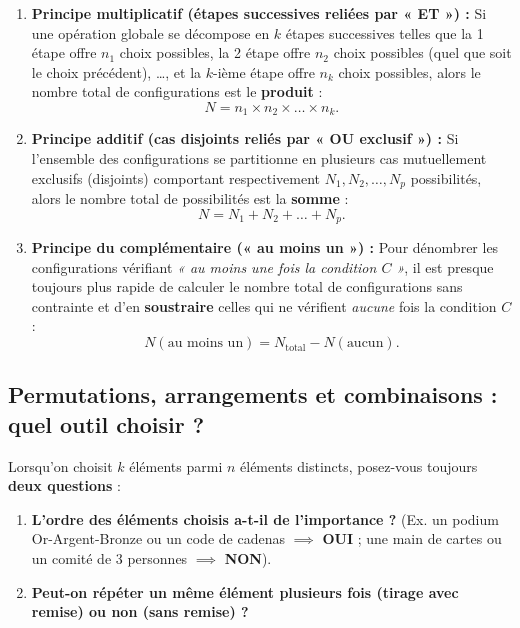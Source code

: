 \begin{theoreme}
\begin{enumerate}
    \item \textbf{Principe multiplicatif (étapes successives reliées par « ET ») :} Si une opération globale se décompose en $k$ étapes successives telles que la 1\iere{} étape offre $n_1$ choix possibles, la 2\ieme{} étape offre $n_2$ choix possibles (quel que soit le choix précédent), \dots, et la $k$-ième étape offre $n_k$ choix possibles, alors le nombre total de configurations est le \textbf{produit} :
    \[
        \boxed{N = n_1 \times n_2 \times \dots \times n_k}.
    \]
    \item \textbf{Principe additif (cas disjoints reliés par « OU exclusif ») :} Si l'ensemble des configurations se partitionne en plusieurs cas mutuellement exclusifs (disjoints) comportant respectivement $N_1, N_2, \dots, N_p$ possibilités, alors le nombre total de possibilités est la \textbf{somme} :
    \[
        \boxed{N = N_1 + N_2 + \dots + N_p}.
    \]
    \item \textbf{Principe du complémentaire (« au moins un ») :} Pour dénombrer les configurations vérifiant \emph{« au moins une fois la condition $C$ »}, il est presque toujours plus rapide de calculer le nombre total de configurations sans contrainte et d'en \textbf{soustraire} celles qui ne vérifient \emph{aucune} fois la condition $C$ :
    \[
        \boxed{N(\text{au moins un}) = N_{\text{total}} - N(\text{aucun})}.
    \]
\end{enumerate}
\end{theoreme}

\subsection{Permutations, arrangements et combinaisons : quel outil choisir ?}

Lorsqu'on choisit $k$ éléments parmi $n$ éléments distincts, posez-vous toujours \textbf{deux questions} :
\begin{enumerate}
    \item \textbf{L'ordre des éléments choisis a-t-il de l'importance ?} (Ex. un podium Or-Argent-Bronze ou un code de cadenas $\implies$ \textbf{OUI} ; une main de cartes ou un comité de 3 personnes $\implies$ \textbf{NON}).
    \item \textbf{Peut-on répéter un même élément plusieurs fois (tirage avec remise) ou non (sans remise) ?}
\end{enumerate}

